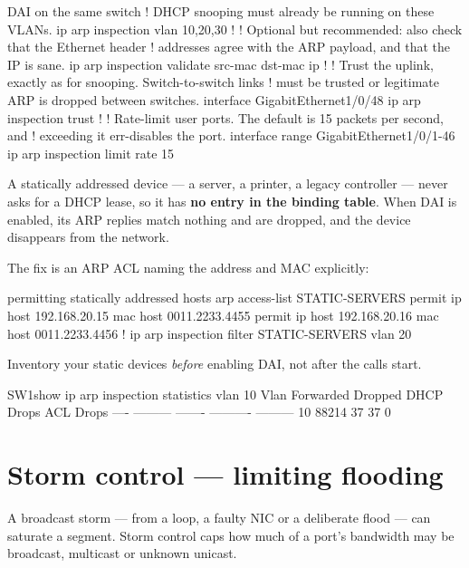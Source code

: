 \begin{config}{DAI on the same switch}
! DHCP snooping must already be running on these VLANs.
ip arp inspection vlan 10,20,30
!
! Optional but recommended: also check that the Ethernet header
! addresses agree with the ARP payload, and that the IP is sane.
ip arp inspection validate src-mac dst-mac ip
!
! Trust the uplink, exactly as for snooping. Switch-to-switch links
! must be trusted or legitimate ARP is dropped between switches.
interface GigabitEthernet1/0/48
 ip arp inspection trust
!
! Rate-limit user ports. The default is 15 packets per second, and
! exceeding it err-disables the port.
interface range GigabitEthernet1/0/1-46
 ip arp inspection limit rate 15
\end{config}

\begin{alertbox}
A statically addressed device --- a server, a printer, a legacy controller ---
never asks for a DHCP lease, so it has \textbf{no entry in the binding table}.
When DAI is enabled, its ARP replies match nothing and are dropped, and the
device disappears from the network.

The fix is an ARP ACL naming the address and MAC explicitly:

\begin{config}{permitting statically addressed hosts}
arp access-list STATIC-SERVERS
 permit ip host 192.168.20.15 mac host 0011.2233.4455
 permit ip host 192.168.20.16 mac host 0011.2233.4456
!
ip arp inspection filter STATIC-SERVERS vlan 20
\end{config}

Inventory your static devices \emph{before} enabling DAI, not after the calls
start.
\end{alertbox}

\begin{verify}{SW1}{show ip arp inspection statistics vlan 10}
 Vlan      Forwarded        Dropped     DHCP Drops      ACL Drops
 ----      ---------        -------     ----------      ---------
   10          88214             37             37              0
\end{verify}

\section{Storm control --- limiting flooding}

A broadcast storm --- from a loop, a faulty NIC or a deliberate flood --- can
saturate a segment. Storm control caps how much of a port's bandwidth may be
broadcast, multicast or unknown unicast.

